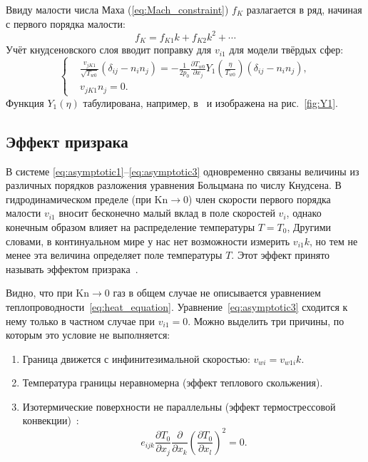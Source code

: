 \documentclass[english,russian,a4paper,12pt]{article}
\newcommand{\Kn}{\mathrm{Kn}}
\newcommand{\pder}[2][]{\frac{\partial#1}{\partial#2}}
\begin{document}
Ввиду малости числа Маха (\ref{eq:Mach_constraint}) \(f_K\) разлагается в ряд, начиная с первого порядка малости:
\[ f_K = f_{K1}k + f_{K2}k^2 + \cdots \]
Учёт кнудсеновского слоя вводит поправку для \(v_{i1}\) для модели твёрдых сфер:
\begin{equation}
	\left\{
	\begin{aligned}
		& \frac{v_{jK1}}{\sqrt{T_{w0}}}(\delta_{ij}-n_in_j) = 
			-\frac1{2p_0}\pder[T_{w0}]{x_j} Y_1\left(\frac\eta{T_{w0}}\right) (\delta_{ij}-n_in_j), \\
		& v_{jK1}n_j = 0.
	\end{aligned}
	\right. \label{eq:bound:v_K}
\end{equation}
Функция \(Y_1(\eta)\) табулирована, например, в~\cite{Sone2002, Sone2007} и изображена на рис.~\ref{fig:Y1}.

\subsection{Эффект призрака}

В системе \eqref{eq:asymptotic1}--\eqref{eq:asymptotic3} одновременно связаны величины 
из различных порядков разложения уравнения Больцмана по числу Кнудсена.
В гидродинамическом пределе (при \(\Kn\to0\)) член скорости первого порядка малости \(v_{i1}\)
вносит бесконечно малый вклад в поле скоростей \(v_i\),
однако конечным образом влияет на распределение температуры \(T=T_0\),
Другими словами, в континуальном мире у нас нет возможности измерить \(v_{i1}k\),
но тем не менее эта величина определяет поле температуры \(T\).
Этот эффект принято называть эффектом призрака~\cite{Sone2002, Sone2007}.

Видно, что при \(\Kn\to0\) газ в общем случае не описывается уравнением теплопроводности~\eqref{eq:heat_equation}.
Уравнение~\eqref{eq:asymptotic3} сходится к нему только в частном случае при \(v_{i1} = 0\).
Можно выделить три причины, по которым это условие не выполняется:
\begin{enumerate}
	\item Граница движется с инфинитезимальной скоростью: \(v_{wi} = v_{w1i}k\).
	\item Температура границы неравномерна (эффект теплового скольжения).
	\item Изотермические поверхности не параллельны (эффект термострессовой конвекции)~\cite{Kogan1976}:
		\begin{equation}
			e_{ijk}\pder[T_0]{x_j}\pder{x_k}\left(\pder[T_0]{x_l}\right)^2 = 0.
		\end{equation}
\end{enumerate}
\end{document}
